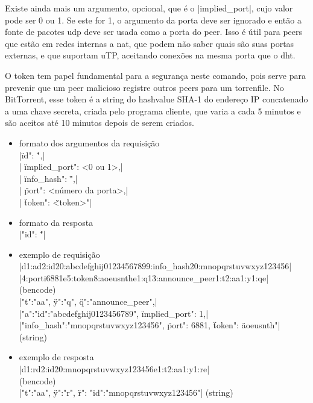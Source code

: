 Existe ainda mais um argumento, opcional, que é o \bverb|implied_port|, cujo valor pode
ser 0 ou 1. Se este for 1, o argumento da porta deve ser ignorado e então a fonte de
pacotes \gls*{udp} deve ser usada como a porta do \gls*{peer}. Isso é útil para
\glspl*{peer} que estão em redes internas a \gls{nat}, que podem não saber quais são
suas portas externas, e que suportam uTP, aceitando conexões na mesma porta que o
\gls*{dht}.

O token tem papel fundamental para a segurança neste comando, pois serve para prevenir
que um \gls*{peer} malicioso registre outros \glspl*{peer} para um \gls*{torrenfile}.
No BitTorrent, esse token é a \gls*{string} do \gls*{hashvalue} SHA-1 do endereço IP
concatenado a uma chave secreta, criada pelo programa cliente, que varia a cada 5
minutos e são aceitos até 10 minutos depois de serem criados.

\newpage
\begin{itemize}
    \item formato dos argumentos da requisição \\
        \sverb|{\"id": \"<IDs dos nós consultantes>",| \\
        \sverb| \"implied_port": <0 ou 1>,| \\
        \sverb| \"info_hash": \"<hash de 20 bytes do torrent>",| \\
        \sverb| \"port": <número da porta>,| \\
        \sverb| \"token": \"<token>"}|

    \item formato da resposta \\
        \sverb|{"id": \"<IDs dos nós consultados>"}|
\end{itemize}


\begin{itemize}
    \item exemplo de requisição \\
        \bverb|d1:ad2:id20:abcdefghij01234567899:info_hash20:mnopqrstuvwxyz123456| \\
        \bverb|4:porti6881e5:token8:aoeusnthe1:q13:announce_peer1:t2:aa1:y1:qe| \\
        (\gls*{bencode}) \\
        \sverb|{"t":"aa", \"y":"q", \"q":"announce_peer",| \\
        \sverb|"a":{"id":"abcdefghij0123456789", \"implied_port": 1,| \\
        \sverb|"info_hash":"mnopqrstuvwxyz123456", \"port": 6881, \"token": \"aoeusnth"}}|
        (\gls*{string})

    \item exemplo de resposta \\
        \bverb|d1:rd2:id20:mnopqrstuvwxyz123456e1:t2:aa1:y1:re| \\
        (\gls*{bencode}) \\
        \sverb|{"t":"aa", \"y":"r", \"r": {"id":"mnopqrstuvwxyz123456"}}|
        (\gls*{string})
\end{itemize}

